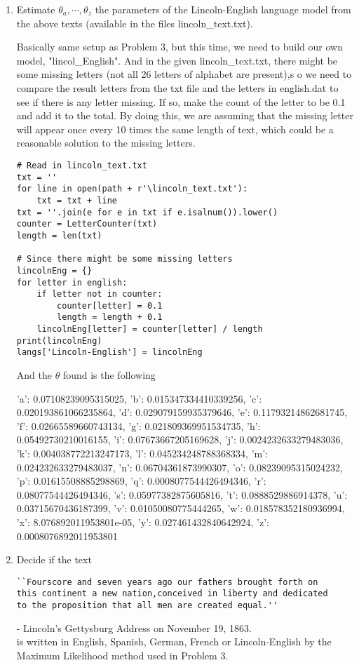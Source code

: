\documentclass[preprint,12pt]{elsarticle}
\begin{document}
    \begin{enumerate}[label=\alph*]
        \item Estimate $\theta_a,\cdots,\theta_z$ the parameters of the Lincoln-English language model from the above texts (available in the files lincoln\_text.txt).
        
        Basically same setup as Problem 3, but this time, we need to build our own model, "lincol\_English". And in the given lincoln\_text.txt, there might be some missing letters (not all 26 letters of alphabet are present),s o we need to compare the result letters from the txt file and the letters in english.dat to see if there is any letter missing. If so, make the count of the letter to be 0.1 and add it to the total. By doing this, we are assuming that the missing letter will appear once every 10 times the same length of text, which could be a reasonable solution to the missing letters.
        \begin{lstlisting}
# Read in lincoln_text.txt
txt = ''
for line in open(path + r'\lincoln_text.txt'):
    txt = txt + line
txt = ''.join(e for e in txt if e.isalnum()).lower()
counter = LetterCounter(txt)
length = len(txt)

# Since there might be some missing letters
lincolnEng = {}
for letter in english:
    if letter not in counter:
        counter[letter] = 0.1
        length = length + 0.1
    lincolnEng[letter] = counter[letter] / length
print(lincolnEng)
langs['Lincoln-English'] = lincolnEng
        \end{lstlisting}
        And the $\theta$ found is the following
        \begin{spverbatim}
{'a': 0.07108239095315025, 'b': 0.015347334410339256, 
'c': 0.020193861066235864, 'd': 0.029079159935379646, 
'e': 0.11793214862681745, 'f': 0.02665589660743134, 
'g': 0.021809369951534735, 'h': 0.05492730210016155, 
'i': 0.07673667205169628, 'j': 0.0024232633279483036,
'k': 0.004038772213247173, 'l': 0.045234248788368334, 
'm': 0.024232633279483037, 'n': 0.06704361873990307, 
'o': 0.08239095315024232, 'p': 0.01615508885298869,
'q': 0.0008077544426494346, 'r': 0.08077544426494346, 
's': 0.05977382875605816, 't': 0.0888529886914378,
'u': 0.03715670436187399, 'v': 0.01050080775444265, 
'w': 0.018578352180936994, 'x': 8.076892011953801e-05, 
'y': 0.027461432840642924, 'z': 0.0008076892011953801}
        \end{spverbatim}
    
        \item  Decide if the text \\
        \begin{verbatim}
``Fourscore and seven years ago our fathers brought forth on 
this continent a new nation,conceived in liberty and dedicated 
to the proposition that all men are created equal.''
        \end{verbatim}
        - Lincoln's Gettysburg Address on November 19, 1863.\\
        is written in English, Spanish, German, French or Lincoln-English by the Maximum Likelihood method
        used in Problem 3.
        

\end{enumerate}
\end{document}
